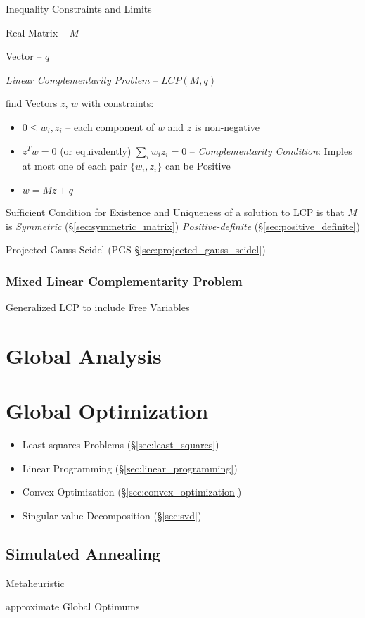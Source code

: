 Inequality Constraints and Limits %

Real Matrix -- $M$

Vector -- $q$

\emph{Linear Complementarity Problem} -- $LCP(M,q)$

find Vectors $z$, $w$ with constraints:

\begin{itemize}
  \item $0 \leq w_i,z_i$ -- each component of $w$ and $z$ is
    non-negative
  \item $z^T w = 0$ (or equivalently) $\sum_i w_i z_i = 0$ --
    \emph{Complementarity Condition}: Imples at most one of each pair
    $\{w_i,z_i\}$ can be Positive
  \item $w = M z + q$
\end{itemize}

Sufficient Condition for Existence and Uniqueness of a solution to LCP
is that $M$ is \emph{Symmetric} (\S\ref{sec:symmetric_matrix})
\emph{Positive-definite} (\S\ref{sec:positive_definite})

\fist Projected Gauss-Seidel (PGS \S\ref{sec:projected_gauss_seidel})



\subsubsection{Mixed Linear Complementarity Problem}\label{sec:mlcp}

Generalized LCP to include Free Variables



\section{Global Analysis}\label{sec:global_analysis}

\section{Global Optimization}\label{sec:global_optimization}

\begin{itemize}
  \item Least-squares Problems (\S\ref{sec:least_squares})
  \item Linear Programming (\S\ref{sec:linear_programming})
  \item Convex Optimization (\S\ref{sec:convex_optimization})
  \item Singular-value Decomposition (\S\ref{sec:svd})
\end{itemize}



\subsection{Simulated Annealing}\label{sec:simualted_annealing}

Metaheuristic

approximate Global Optimums
